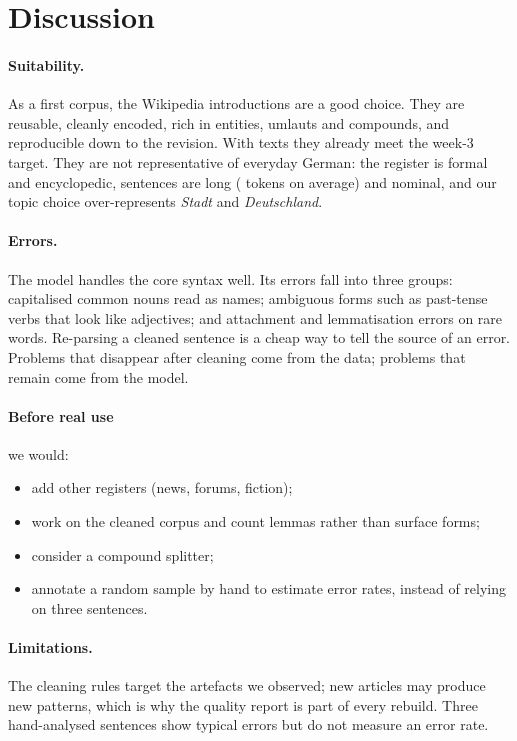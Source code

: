\documentclass[11pt,a4paper]{article}
\newcommand{\de}[1]{\textit{#1}}
\begin{document}
\section{Discussion}\label{sec:discussion}
\paragraph{Suitability.} As a first corpus, the Wikipedia introductions are a good choice. They are reusable, cleanly encoded, rich in entities, umlauts and compounds, and reproducible down to the revision. With \NTexts{} texts they already meet the week-3 target. They are not representative of everyday German: the register is formal and encyclopedic, sentences are long (\TokPerSent{} tokens on average) and nominal, and our topic choice over-represents \de{Stadt} and \de{Deutschland}.

\paragraph{Errors.} The model handles the core syntax well. Its errors fall into three groups: capitalised common nouns read as names; ambiguous forms such as past-tense verbs that look like adjectives; and attachment and lemmatisation errors on rare words. Re-parsing a cleaned sentence is a cheap way to tell the source of an error. Problems that disappear after cleaning come from the data; problems that remain come from the model.

\paragraph{Before real use} we would:
\begin{itemize}
  \item add other registers (news, forums, fiction);
  \item work on the cleaned corpus and count lemmas rather than surface forms;
  \item consider a compound splitter;
  \item annotate a random sample by hand to estimate error rates, instead of relying on three sentences.
\end{itemize}

\paragraph{Limitations.} The cleaning rules target the artefacts we observed; new articles may produce new patterns, which is why the quality report is part of every rebuild. Three hand-analysed sentences show typical errors but do not measure an error rate.
\end{document}
